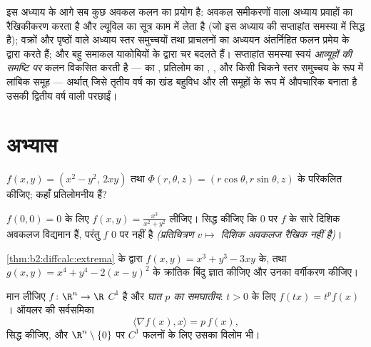 \begin{remark}[यह कहाँ काम आता है]
इस अध्याय के आगे सब कुछ अवकल कलन का प्रयोग है: अवकल समीकरणों वाला अध्याय
प्रवाहों का रैखिकीकरण करता है और ल्यूविल का  सूत्र काम में लेता है
(जो इस अध्याय की सप्ताहांत समस्या में सिद्ध है); वक्रों और पृष्ठों वाले
अध्याय स्तर समुच्चयों तथा प्राचलनों का अध्ययन अंतर्निहित फलन प्रमेय के
द्वारा करते हैं; और बहु समाकल याकोबियों के द्वारा चर बदलते हैं। सप्ताहांत
समस्या स्वयं \emph{आव्यूहों की समष्टि पर} कलन विकसित करती है ---  का
, प्रतिलोम का , , और किसी चिकने स्तर समुच्चय के रूप
में लांबिक समूह --- अर्थात् जिसे तृतीय वर्ष का खंड बहुविध और ली समूहों के
रूप में औपचारिक बनाता है उसकी द्वितीय वर्ष वाली परछाईं।
\end{remark}

\section{अभ्यास}

\begin{exercise}[$\star$]\label{exo:b2:diffcalc:1}
$f(x,y) = (x^2 - y^2,\, 2xy)$ तथा $\Phi(r,\theta,z) = (r\cos\theta, r\sin\theta, z)$ के  परिकलित कीजिए;  कहाँ प्रतिलोमनीय हैं?
\end{exercise}

\begin{exercise}[$\star$]\label{exo:b2:diffcalc:2}
$f(0,0) = 0$ के लिए $f(x,y) = \frac{x^3}{x^2 + y^2}$ लीजिए। सिद्ध कीजिए कि $0$ पर $f$ के सारे दिशिक अवकलज
विद्यमान हैं, परंतु $f$ $0$ पर  नहीं है \emph{(प्रतिचित्रण $v \mapsto$
दिशिक अवकलज रैखिक नहीं है)}।
\end{exercise}

\begin{exercise}[$\star$]\label{exo:b2:diffcalc:3}
\cref{thm:b2:diffcalc:extrema} के द्वारा $f(x, y) = x^3 + y^3 -
3xy$ के, तथा $g(x,y) = x^4 +
y^4 - 2(x - y)^2$ के क्रांतिक बिंदु ज्ञात कीजिए और उनका
वर्गीकरण कीजिए।
\end{exercise}

\begin{exercise}[$\star\star$]\label{exo:b2:diffcalc:4}
मान लीजिए $f \colon \R^n \to \R$ $C^1$ है और \emph{घात $p$ का समघातीय}: $t > 0$ के लिए $f(tx) = t^pf(x)$। ऑयलर
की सर्वसमिका
\[
\langle \nabla f(x), x\rangle = p\,f(x) ,
\]
सिद्ध कीजिए, और $\R^n\setminus\{0\}$ पर $C^1$ फलनों के लिए उसका विलोम भी।
\end{exercise}

